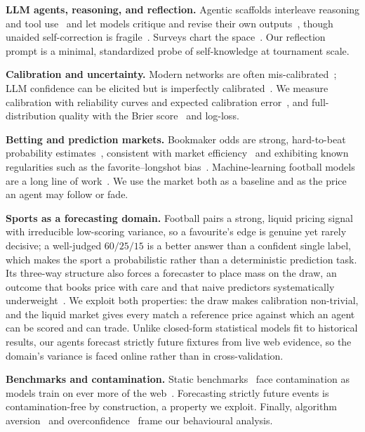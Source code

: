 \documentclass[sigconf,review]{acmart}
\begin{document}
\textbf{LLM agents, reasoning, and reflection.} Agentic scaffolds interleave
reasoning and tool use~\cite{yao2023react,wei2022cot} and let models critique and
revise their own outputs~\cite{shinn2023reflexion,madaan2023selfrefine}, though
unaided self-correction is fragile~\cite{huang2024selfcorrect}. Surveys chart the
space~\cite{xi2023agents,wang2024agentsurvey}. Our reflection prompt is a
minimal, standardized probe of self-knowledge at tournament scale.

\textbf{Calibration and uncertainty.} Modern networks are often
mis-calibrated~\cite{guo2017calibration}; LLM confidence can be elicited but is
imperfectly calibrated~\cite{kadavath2022know,tian2023calibration,xiong2024uncertainty}.
We measure calibration with reliability curves and expected calibration
error~\cite{naeini2015ece}, and full-distribution quality with the Brier
score~\cite{brier1950} and log-loss.

\textbf{Betting and prediction markets.} Bookmaker odds are strong, hard-to-beat
probability estimates~\cite{strumbelj2014odds,wunderlich2018odds,angelini2019efficiency},
consistent with market efficiency~\cite{fama1970efficient} and exhibiting known
regularities such as the favorite--longshot bias~\cite{snowberg2010favorite,levitt2004gambling}.
Machine-learning football models are a long line of
work~\cite{constantinou2012pifootball,baboota2019football}. We use the market
both as a baseline and as the price an agent may follow or fade.

\textbf{Sports as a forecasting domain.} Football pairs a strong, liquid pricing
signal with irreducible low-scoring variance, so a favourite's edge is genuine
yet rarely decisive; a well-judged $60/25/15$ is a better answer than a
confident single label, which makes the sport a probabilistic rather than a
deterministic prediction task. Its three-way structure also forces a forecaster
to place mass on the draw, an outcome that books price with care and that naive
predictors systematically underweight~\cite{constantinou2012pifootball}. We
exploit both properties: the draw makes calibration non-trivial, and the liquid
market gives every match a reference price against which an agent can be scored
and can trade. Unlike closed-form statistical models fit to historical results,
our agents forecast strictly future fixtures from live web evidence, so the
domain's variance is faced online rather than in cross-validation.

\textbf{Benchmarks and contamination.} Static benchmarks~\cite{hendrycks2021mmlu,liang2023helm}
face contamination as models train on ever more of the web~\cite{golchin2024contamination}.
Forecasting strictly future events is contamination-free by construction, a
property we exploit. Finally, algorithm aversion~\cite{dietvorst2015aversion} and
overconfidence~\cite{moore2008overconfidence} frame our behavioural analysis.
\end{document}
